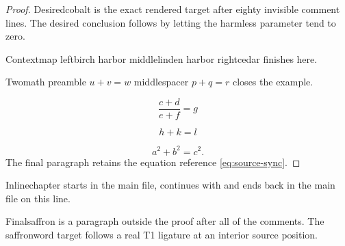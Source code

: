 \documentclass{article}
\begin{document}
\begin{proof}

Desiredcobalt is the exact rendered target after eighty invisible comment lines.
The desired conclusion follows by letting the harmless parameter tend to zero.

Contextmap leftbirch harbor middlelinden harbor rightcedar finishes here.

Twomath preamble $u+v=w$ middlespacer $p+q=r$ closes the example.

\begin{equation*}
\frac{c+d}{e+f}=g
\end{equation*}

\[
h+k
= l
\]

\begin{equation}\label{eq:source-sync}
a^2+b^2=c^2.
\end{equation}
The final paragraph retains the equation reference \eqref{eq:source-sync}.
\end{proof}

Inlinechapter starts in the main file, continues with  and ends
back in the main file on this line.

Finalsaffron is a paragraph outside the proof after all of the comments.
The saffronword target follows a real T1 ligature at an interior source position.
\end{document}
